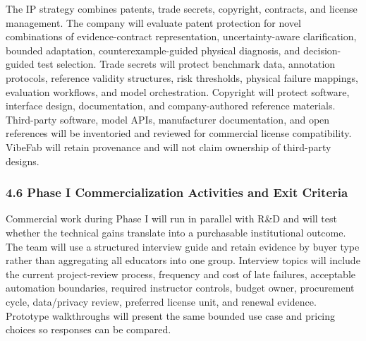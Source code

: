\documentclass[11pt,letterpaper]{article}
\begin{document}
The IP strategy combines patents, trade secrets, copyright, contracts, and license management. The company will evaluate patent protection for novel combinations of evidence-contract representation, uncertainty-aware clarification, bounded adaptation, counterexample-guided physical diagnosis, and decision-guided test selection. Trade secrets will protect benchmark data, annotation protocols, reference validity structures, risk thresholds, physical failure mappings, evaluation workflows, and model orchestration. Copyright will protect software, interface design, documentation, and company-authored reference materials. Third-party software, model APIs, manufacturer documentation, and open references will be inventoried and reviewed for commercial license compatibility. VibeFab will retain provenance and will not claim ownership of third-party designs.






\subsubsection*{4.6 Phase I Commercialization Activities and Exit Criteria}
Commercial work during Phase I will run in parallel with R\&D and will test whether the technical gains translate into a purchasable institutional outcome. The team will use a structured interview guide and retain evidence by buyer type rather than aggregating all educators into one group. Interview topics will include the current project-review process, frequency and cost of late failures, acceptable automation boundaries, required instructor controls, budget owner, procurement cycle, data/privacy review, preferred license unit, and renewal evidence. Prototype walkthroughs will present the same bounded use case and pricing choices so responses can be compared.
\end{document}
